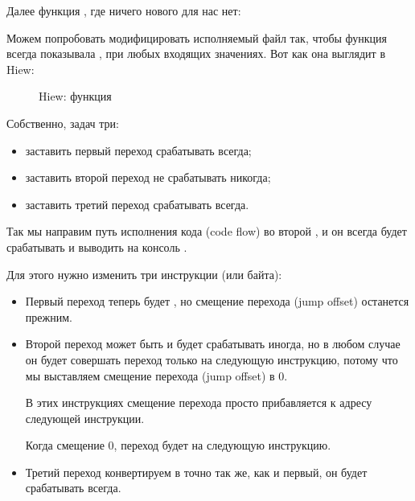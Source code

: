 Далее функция \main, где ничего нового для нас нет:





\clearpage
{}

Можем попробовать модифицировать исполняемый файл так, чтобы функция  всегда показывала ,
при любых входящих значениях.
Вот как она выглядит в Hiew:

\begin{figure}[H]
\centering
{}
\caption{Hiew: функция }
\label{fig:jcc_hiew_1}
\end{figure}

Собственно, задач три:
\begin{itemize}
\item заставить первый переход срабатывать всегда;
\item заставить второй переход не срабатывать никогда;
\item заставить третий переход срабатывать всегда.
\end{itemize}

Так мы направим путь исполнения кода (code flow) во второй \printf,
и он всегда будет срабатывать и выводить на консоль .

Для этого нужно изменить три инструкции (или байта):

\begin{itemize}
\item Первый переход теперь будет \JMP, но смещение перехода 
(\gls{jump offset}) останется прежним.

\item Второй переход может быть и будет срабатывать иногда, но в любом случае он будет совершать переход
только на следующую инструкцию, потому что мы выставляем смещение перехода (\gls{jump offset}) в 0.

В этих инструкциях смещение перехода просто прибавляется к адресу следующей инструкции.

Когда смещение 0, переход будет на следующую инструкцию.

\item Третий переход конвертируем в \JMP точно так же, как и первый, он будет срабатывать всегда.

\end{itemize}

